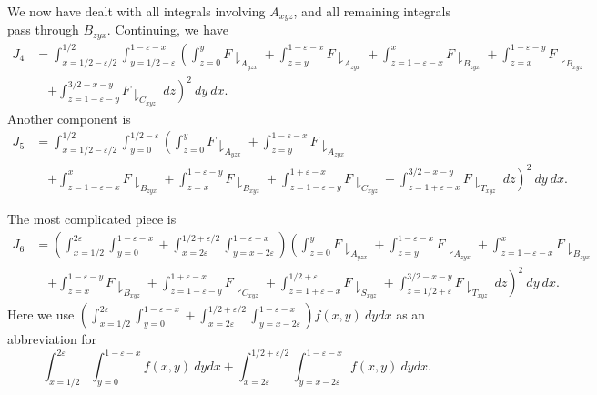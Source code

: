 \documentclass{bmcart}
\theoremstyle{plain}
\theoremstyle{definition}
\newcommand\eps{\varepsilon}
\begin{document}
We now have dealt with all integrals involving $A_{xyz}$, and all remaining integrals pass through $B_{zyx}$.  Continuing, we have
\begin{align*}
J_4 & =\int_{x=1/2-\eps/2}^{1/2}\int_{y=1/2-\eps}^{1-\eps-x} \left(\int_{z=0}^{y}F\downharpoonright_{A_{yzx}}+\int_{z=y}^{1-\eps-x}F\downharpoonright_{A_{zyx}} +\int_{z=1-\eps-x}^{x}F\downharpoonright_{B_{zyx}} +\int_{z=x}^{1-\eps-y}F\downharpoonright_{B_{xyz}}\right. \\
&\quad \left. +\int_{z=1-\eps-y}^{3/2-x-y}F\downharpoonright_{C_{xyz}}\ dz \right)^{2}\ dy\ dx.
\end{align*}
Another component is
\begin{align*}
J_5 & = \int_{x=1/2-\eps/2}^{1/2}\int_{y=0}^{1/2-\eps} \left(\int_{z=0}^{y}F\downharpoonright_{A_{yzx}}+\int_{z=y}^{1-\eps-x}F\downharpoonright_{A_{zyx}} \right. \\
&\quad \left. +\int_{z=1-\eps-x}^{x}F\downharpoonright_{B_{zyx}} +\int_{z=x}^{1-\eps-y}F\downharpoonright_{B_{xyz}} +\int_{z=1-\eps-y}^{1+\eps-x}F\downharpoonright_{C_{xyz}} + \int_{z=1+\eps-x}^{3/2-x-y}F\downharpoonright_{T_{xyz}}\ dz \right)^{2}\ dy\ dx.
\end{align*}

The most complicated piece is
\begin{align*}
J_6 & =\left(\int_{x=1/2}^{2\eps} \int_{y=0}^{1-\eps-x} + \int_{x=2\eps}^{1/2+\eps/2}\int_{y=x-2\eps}^{1-\eps-x} \right) \left(\int_{z=0}^{y}F\downharpoonright_{A_{yzx}}+\int_{z=y}^{1-\eps-x}F\downharpoonright_{A_{zyx}} +\int_{z=1-\eps-x}^{x}F\downharpoonright_{B_{zyx}}  \right. \\
&\quad \left. +\int_{z=x}^{1-\eps-y}F\downharpoonright_{B_{xyz}} +\int_{z=1-\eps-y}^{1+\eps-x}F\downharpoonright_{C_{xyz}} + \int_{z=1+\eps-x}^{1/2+\eps}F\downharpoonright_{S_{xyz}}+ \int_{z=1/2+\eps}^{3/2-x-y}F\downharpoonright_{T_{xyz}}\ dz \right)^{2}\ dy\ dx.
\end{align*}
Here we use $\left(\int_{x=1/2}^{2\eps} \int_{y=0}^{1-\eps-x} + \int_{x=2\eps}^{1/2+\eps/2}\int_{y=x-2\eps}^{1-\eps-x} \right) f(x,y)\ dy dx$ as an abbreviation for
$$ \int_{x=1/2}^{2\eps} \int_{y=0}^{1-\eps-x} f(x,y)\ dy dx + \int_{x=2\eps}^{1/2+\eps/2}\int_{y=x-2\eps}^{1-\eps-x} f(x,y)\ dy dx.$$
\end{document}
